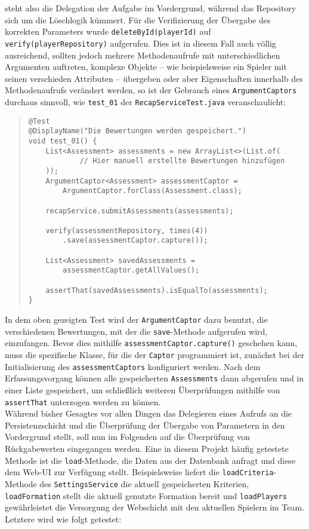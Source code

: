 steht also die Delegation der Aufgabe im Vordergrund, während das Repository sich 
um die Löschlogik kümmert. Für die Verifizierung der Übergabe des korrekten 
Parameters wurde \texttt{deleteById(playerId)} auf \texttt{verify(playerRepository)} 
aufgerufen. Dies ist in diesem Fall auch völlig ausreichend, sollten jedoch mehrere 
Methodenaufrufe mit unterschiedlichen Argumenten auftreten, komplexe Objekte -- wie 
beispielsweise ein Spieler mit seinen verschieden Attributen -- übergeben oder aber 
Eigenschaften innerhalb des Methodenaufrufs verändert werden, so ist der Gebrauch 
eines \texttt{ArgumentCaptors} durchaus sinnvoll, wie \texttt{test\_01} der 
\texttt{RecapServiceTest.java} veranschaulicht: 


\pagebreak


\begin{quote}
\begin{verbatim}
@Test
@DisplayName("Die Bewertungen werden gespeichert.")
void test_01() {
    List<Assessment> assessments = new ArrayList<>(List.of(
            // Hier manuell erstellte Bewertungen hinzufügen 
    ));
    ArgumentCaptor<Assessment> assessmentCaptor = 
        ArgumentCaptor.forClass(Assessment.class);

    recapService.submitAssessments(assessments);

    verify(assessmentRepository, times(4))
        .save(assessmentCaptor.capture());

    List<Assessment> savedAssessments = 
        assessmentCaptor.getAllValues();

    assertThat(savedAssessments).isEqualTo(assessments);
}
\end{verbatim}
\end{quote}

In dem oben gezeigten Test wird der \texttt{ArgumentCaptor} dazu benutzt, die 
verschiedenen Bewertungen, mit der die \texttt{save}-Methode aufgerufen wird, 
einzufangen. Bevor dies mithilfe \texttt{assessmentCaptor.capture()} geschehen kann, 
muss die spezifische Klasse, für die der \texttt{Captor} programmiert ist, zunächst 
bei der Initialisierung des \texttt{assessmentCaptors} konfiguriert werden. Nach dem 
Erfassungsvorgang können alle gespeicherten \texttt{Assessments} dann abgerufen und 
in einer Liste gespeichert, um schließlich weiteren Überprüfungen mithilfe von 
\texttt{assertThat} unterzogen werden zu können. \\ 
Während bisher Gesagtes vor allen Dingen das Delegieren eines Aufrufs an die 
Persistenzschicht und die Überprüfung der Übergabe von Parametern in den Vordergrund 
stellt, soll nun im Folgenden auf die Überprüfung von Rückgabewerten eingegangen 
werden. Eine in diesem Projekt häufig getestete Methode ist die 
\texttt{load}-Methode, die Daten aus der Datenbank anfragt und diese dem Web-UI zur 
Verfügung stellt. Beispielsweise liefert die \texttt{loadCriteria}-Methode des 
\texttt{SettingsService} die aktuell gespeicherten Kriterien, \texttt{loadFormation} 
stellt die aktuell genutzte Formation bereit und \texttt{loadPlayers} gewährleistet 
die Versorgung der Webschicht mit den aktuellen Spielern im Team. Letztere wird wie folgt getestet: 

